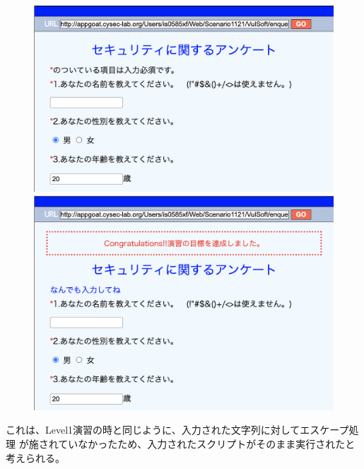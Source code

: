 \documentclass[dvipdfmx,autodetect-engine,titlepage]{jsarticle}
\begin{document}
\begin{figure}[h]
  \centering
  \begin{minipage}[b]{0.45\linewidth}
  \begin{center}
    \includegraphics[keepaspectratio,scale=0.37]{pic3.png}
    \end{center}
    \caption{}
  \end{minipage}
  \begin{minipage}[b]{0.45\linewidth}
  \begin{center}
    \includegraphics[keepaspectratio,scale=0.35]{pic4.png}
    \end{center}
    \caption{}
  \end{minipage}
\end{figure}

これは、Level1演習の時と同じように、入力された文字列に対してエスケープ処理
が施されていなかったため、入力されたスクリプトがそのまま実行されたと考えられる。
\end{document}
